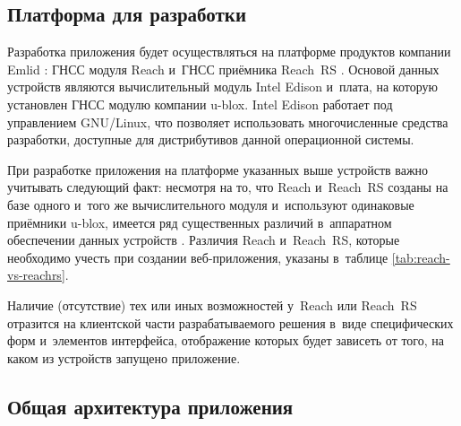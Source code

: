 
\subsection{Платформа для разработки}
\label{subsec:reach-and-reachrs}

Разработка приложения будет осуществляться на платформе продуктов компании Emlid \cite{Emlid}: ГНСС модуля Reach \cite{Reach} и~ГНСС приёмника Reach~RS \cite{ReachRS}. Основой данных устройств являются вычислительный модуль Intel Edison и~плата, на которую установлен ГНСС модулю компании u-blox. Intel Edison работает под управлением GNU/Linux, что позволяет использовать многочисленные средства разработки, доступные для дистрибутивов данной операционной системы. \par

При разработке приложения на платформе указанных выше устройств важно учитывать следующий факт: несмотря на то, что Reach и~Reach~RS созданы на базе одного и~того же вычислительного модуля и~используют одинаковые приёмники u-blox, имеется ряд существенных различий в~аппаратном обеспечении данных устройств \cite{Reach, ReachRS}. Различия Reach и~Reach~RS, которые необходимо учесть при создании веб-приложения, указаны в~таблице \ref{tab:reach-vs-reachrs}.


Наличие (отсутствие) тех или иных возможностей у~Reach или Reach~RS отразится на клиентской части разрабатываемого решения в~виде специфических форм и~элементов интерфейса, отображение которых будет зависеть от того, на каком из устройств запущено приложение.

\subsection{Общая архитектура приложения}
\label{subsec:raw-app-architecture}

